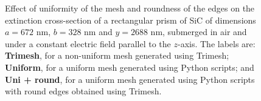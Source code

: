  \begin{figure}
    \centering
    \caption{Effect of uniformity of the mesh and roundness of the edges on the 
    extinction cross-section of a rectangular prism of SiC of dimensions $a=672$ nm, 
    $b=328$ nm and $y=2688$ nm, submerged in air and under a constant electric field 
    parallel to the $z$-axis. The labels are: \textbf{Trimesh}, for a non-uniform mesh generated using Trimesh; 
    \textbf{Uniform}, for a uniform mesh generated using Python scripts; and 
    \textbf{Uni + round}, for a uniform mesh generated using Python scripts with round 
    edges obtained using Trimesh.}
    \label{fig:tri_reg_round_14}
 \end{figure}

